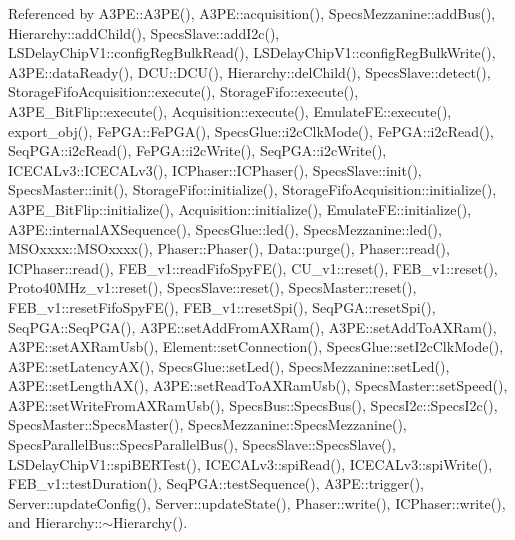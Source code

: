 Referenced by A3\+P\+E\+::\+A3\+P\+E(), A3\+P\+E\+::acquisition(), Specs\+Mezzanine\+::add\+Bus(), Hierarchy\+::add\+Child(), Specs\+Slave\+::add\+I2c(), L\+S\+Delay\+Chip\+V1\+::config\+Reg\+Bulk\+Read(), L\+S\+Delay\+Chip\+V1\+::config\+Reg\+Bulk\+Write(), A3\+P\+E\+::data\+Ready(), D\+C\+U\+::\+D\+C\+U(), Hierarchy\+::del\+Child(), Specs\+Slave\+::detect(), Storage\+Fifo\+Acquisition\+::execute(), Storage\+Fifo\+::execute(), A3\+P\+E\+\_\+\+Bit\+Flip\+::execute(), Acquisition\+::execute(), Emulate\+F\+E\+::execute(), export\+\_\+obj(), Fe\+P\+G\+A\+::\+Fe\+P\+G\+A(), Specs\+Glue\+::i2c\+Clk\+Mode(), Fe\+P\+G\+A\+::i2c\+Read(), Seq\+P\+G\+A\+::i2c\+Read(), Fe\+P\+G\+A\+::i2c\+Write(), Seq\+P\+G\+A\+::i2c\+Write(), I\+C\+E\+C\+A\+Lv3\+::\+I\+C\+E\+C\+A\+Lv3(), I\+C\+Phaser\+::\+I\+C\+Phaser(), Specs\+Slave\+::init(), Specs\+Master\+::init(), Storage\+Fifo\+::initialize(), Storage\+Fifo\+Acquisition\+::initialize(), A3\+P\+E\+\_\+\+Bit\+Flip\+::initialize(), Acquisition\+::initialize(), Emulate\+F\+E\+::initialize(), A3\+P\+E\+::internal\+A\+X\+Sequence(), Specs\+Glue\+::led(), Specs\+Mezzanine\+::led(), M\+S\+Oxxxx\+::\+M\+S\+Oxxxx(), Phaser\+::\+Phaser(), Data\+::purge(), Phaser\+::read(), I\+C\+Phaser\+::read(), F\+E\+B\+\_\+v1\+::read\+Fifo\+Spy\+F\+E(), C\+U\+\_\+v1\+::reset(), F\+E\+B\+\_\+v1\+::reset(), Proto40\+M\+Hz\+\_\+v1\+::reset(), Specs\+Slave\+::reset(), Specs\+Master\+::reset(), F\+E\+B\+\_\+v1\+::reset\+Fifo\+Spy\+F\+E(), F\+E\+B\+\_\+v1\+::reset\+Spi(), Seq\+P\+G\+A\+::reset\+Spi(), Seq\+P\+G\+A\+::\+Seq\+P\+G\+A(), A3\+P\+E\+::set\+Add\+From\+A\+X\+Ram(), A3\+P\+E\+::set\+Add\+To\+A\+X\+Ram(), A3\+P\+E\+::set\+A\+X\+Ram\+Usb(), Element\+::set\+Connection(), Specs\+Glue\+::set\+I2c\+Clk\+Mode(), A3\+P\+E\+::set\+Latency\+A\+X(), Specs\+Glue\+::set\+Led(), Specs\+Mezzanine\+::set\+Led(), A3\+P\+E\+::set\+Length\+A\+X(), A3\+P\+E\+::set\+Read\+To\+A\+X\+Ram\+Usb(), Specs\+Master\+::set\+Speed(), A3\+P\+E\+::set\+Write\+From\+A\+X\+Ram\+Usb(), Specs\+Bus\+::\+Specs\+Bus(), Specs\+I2c\+::\+Specs\+I2c(), Specs\+Master\+::\+Specs\+Master(), Specs\+Mezzanine\+::\+Specs\+Mezzanine(), Specs\+Parallel\+Bus\+::\+Specs\+Parallel\+Bus(), Specs\+Slave\+::\+Specs\+Slave(), L\+S\+Delay\+Chip\+V1\+::spi\+B\+E\+R\+Test(), I\+C\+E\+C\+A\+Lv3\+::spi\+Read(), I\+C\+E\+C\+A\+Lv3\+::spi\+Write(), F\+E\+B\+\_\+v1\+::test\+Duration(), Seq\+P\+G\+A\+::test\+Sequence(), A3\+P\+E\+::trigger(), Server\+::update\+Config(), Server\+::update\+State(), Phaser\+::write(), I\+C\+Phaser\+::write(), and Hierarchy\+::$\sim$\+Hierarchy().


